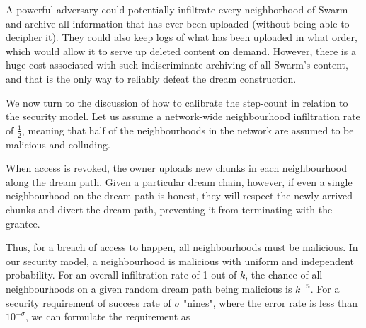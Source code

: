 
A powerful adversary could potentially infiltrate every neighborhood of Swarm and archive all information that has ever been uploaded (without being able to decipher it). They could also keep logs of what has been uploaded in what order, which would allow it to serve up deleted content on demand. However, there is a huge cost associated with such indiscriminate archiving of all Swarm's content, and that is the only way to reliably defeat the dream construction.

We now turn to the discussion of how to calibrate the step-count in relation to the security model. Let us assume a network-wide neighbourhood infiltration rate of $\frac{1}{2}$, meaning that  half of the neighbourhoods in the network are assumed  to be  malicious and colluding. 

When access is revoked, the owner uploads new chunks in each neighbourhood along the dream path. 
Given a particular dream chain, however, if even a single neighbourhood on the dream path is honest, they will respect the newly arrived chunks and divert the dream path, preventing it from terminating with the grantee. 

Thus, for  a breach of access to happen, all neighbourhoods must be malicious.
In our security model, a neighbourhood is malicious with  uniform and independent probability.  For an overall infiltration rate of 1 out of $k$, the chance of all neighbourhoods on a given random dream path being malicious is $k^{-n}$. For a security requirement of success rate of $\sigma$ "nines", where the error rate is less than $10^{-\sigma}$, we can formulate the requirement as

